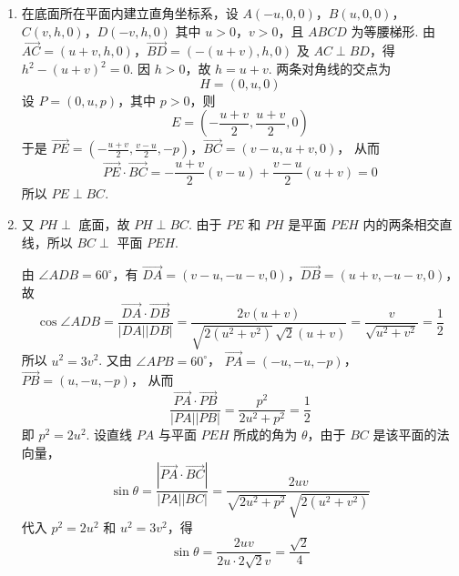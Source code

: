 \begin{solution}
\begin{enumerate}
\item
在底面所在平面内建立直角坐标系，设
\(A(-u,0,0)\)，\(B(u,0,0)\)，\(C(v,h,0)\)，\(D(-v,h,0)\)
其中 \(u>0\)，\(v>0\)，且 \(ABCD\) 为等腰梯形. 由
\(\overrightarrow{AC}=(u+v,h,0)\)，\(\overrightarrow{BD}=(-(u+v),h,0)\)
及 \(AC\perp BD\)，得 \(h^2-(u+v)^2=0\). 因 \(h>0\)，故 \(h=u+v\). 两条对角线的交点为
\[
H=(0,u,0)
\]
设 \(P=(0,u,p)\)，其中 \(p>0\)，则
\[
E=\left(-\frac{u+v}{2},\frac{u+v}{2},0\right)
\]
于是
\(\overrightarrow{PE}=\left(-\frac{u+v}{2},\frac{v-u}{2},-p\right)\)，\(\overrightarrow{BC}=(v-u,u+v,0)\)，
从而
\[
\overrightarrow{PE}\cdot\overrightarrow{BC}
=-\frac{u+v}{2}(v-u)+\frac{v-u}{2}(u+v)=0
\]
所以 \(PE\perp BC\).

\item
又 \(PH\perp\) 底面，故 \(PH\perp BC\). 由于 \(PE\) 和 \(PH\) 是平面 \(PEH\) 内的两条相交直线，所以 \(BC\perp\) 平面 \(PEH\).

由 \(\angle ADB=60^{\circ}\)，有
\(\overrightarrow{DA}=(v-u,-u-v,0)\)，\(\overrightarrow{DB}=(u+v,-u-v,0)\)，
故
\[
\cos\angle ADB
=\frac{\overrightarrow{DA}\cdot\overrightarrow{DB}}{|DA||DB|}
=\frac{2v(u+v)}{\sqrt{2(u^2+v^2)}\,\sqrt{2}(u+v)}
=\frac{v}{\sqrt{u^2+v^2}}=\frac12
\]
所以 \(u^2=3v^2\). 又由 \(\angle APB=60^{\circ}\)，
\(\overrightarrow{PA}=(-u,-u,-p)\)，\(\overrightarrow{PB}=(u,-u,-p)\)，
从而
\[
\frac{\overrightarrow{PA}\cdot\overrightarrow{PB}}{|PA||PB|}
=\frac{p^2}{2u^2+p^2}=\frac12
\]
即 \(p^2=2u^2\). 设直线 \(PA\) 与平面 \(PEH\) 所成的角为 \(\theta\)，由于 \(BC\) 是该平面的法向量，
\[
\sin\theta
=\frac{|\overrightarrow{PA}\cdot\overrightarrow{BC}|}{|PA||BC|}
=\frac{2uv}{\sqrt{2u^2+p^2}\,\sqrt{2(u^2+v^2)}}
\]
代入 \(p^2=2u^2\) 和 \(u^2=3v^2\)，得
\[
\sin\theta=\frac{2uv}{2u\cdot2\sqrt{2}v}
=\frac{\sqrt{2}}{4}
\]
\end{enumerate}
\end{solution}

